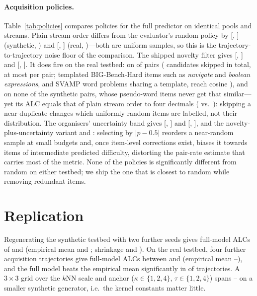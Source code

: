 \documentclass{article}
\begin{document}
\paragraph{Acquisition policies.}
Table~\ref{tab:policies} compares policies for the full predictor on identical pools and streams. Plain stream order differs from the evaluator's random policy by \SPolFirstVsRandomMean{} [\SPolFirstVsRandomLo, \SPolFirstVsRandomHi] (synthetic, \SPolFirstVsRandomSig) and \RPolFirstVsRandomMean{} [\RPolFirstVsRandomLo, \RPolFirstVsRandomHi] (real, \RPolFirstVsRandomSig)---both are uniform samples, so this is the trajectory-to-trajectory noise floor of the comparison. The shipped novelty filter gives \SPolNoveltyVsRandomMean{} [\SPolNoveltyVsRandomLo, \SPolNoveltyVsRandomHi] and \RPolNoveltyVsRandomMean{} [\RPolNoveltyVsRandomLo, \RPolNoveltyVsRandomHi]. It does fire on the real testbed: on \RNovPairsFired{} of \RNovNPairs{} pairs (\RNovSkipped{} candidates skipped in total, at most \RNovMaxSkipped{} per pair; templated BIG-Bench-Hard items such as \emph{navigate} and \emph{boolean expressions}, and SVAMP word problems sharing a template, reach cosine \RNovMaxSim), and on none of the \SNovNPairs{} synthetic pairs, whose pseudo-word items never get that similar---yet its ALC equals that of plain stream order to four decimals (\RPolNoveltyFullAlc{} vs.\ \RPolFirstFullAlc): skipping a near-duplicate changes which uniformly random items are labelled, not their distribution. The organisers' uncertainty band gives \SPolBleVsRandomMean{} [\SPolBleVsRandomLo, \SPolBleVsRandomHi] and \RPolBleVsRandomMean{} [\RPolBleVsRandomLo, \RPolBleVsRandomHi], and the novelty-plus-uncertainty variant \SPolNoveltyUncVsRandomMean{} and \RPolNoveltyUncVsRandomMean: selecting by $|p-0.5|$ reorders a near-random sample at small budgets and, once item-level corrections exist, biases it towards items of intermediate predicted difficulty, distorting the pair-rate estimate that carries most of the metric. None of the policies is significantly different from random on either testbed; we ship the one that is closest to random while removing redundant items.

\section{Replication}
\label{app:replication}
Regenerating the synthetic testbed with two further seeds gives full-model ALCs of \SSeedOneFullAlc{} and \SSeedTwoFullAlc{} (empirical mean \SSeedOneEmpAlc{} and \SSeedTwoEmpAlc; shrinkage \SSeedOneShrinkAlc{} and \SSeedTwoShrinkAlc). On the real testbed, four further acquisition trajectories give full-model ALCs between \RSeedsFullAlcMin{} and \RSeedsFullAlcMax{} (empirical mean \RSeedsEmpAlcMin--\RSeedsEmpAlcMax), and the full model beats the empirical mean significantly in \RSeedsNFullEmpSig{} of \RSeedsN{} trajectories. A $3\times3$ grid over the $k$NN scale and anchor ($\kappa\in\{1,2,4\}$, $\tau\in\{1,2,4\}$) spans \SGridBestFullAlc--\SGridWorstFullAlc{} on a smaller synthetic generator, i.e.\ the kernel constants matter little.
\end{document}
